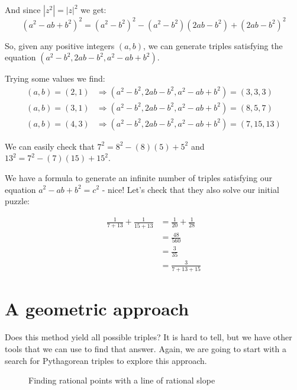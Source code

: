 \documentclass{article}
\begin{document}
And since $|z^2| = |z|^2$ we get:
\[ (a^2-ab+b^2)^2 = (a^2-b^2)^2 - (a^2-b^2)(2ab-b^2) + (2ab-b^2)^2 \]

So, given any positive integers $(a,b)$, we can generate triples satisfying the equation 
$(a^2-b^2, 2ab-b^2, a^2-ab+b^2)$.

Trying some values we find:
\begin{equation*}
        \begin{split}
		(a,b) = (2,1) & \Rightarrow (a^2-b^2, 2ab-b^2, a^2-ab+b^2) = (3, 3, 3) \\
		(a,b) = (3,1) & \Rightarrow (a^2-b^2, 2ab-b^2, a^2-ab+b^2) = (8, 5, 7) \\
		(a,b) = (4,3) & \Rightarrow (a^2-b^2, 2ab-b^2, a^2-ab+b^2) = (7, 15, 13)
	\end{split}
\end{equation*}

We can easily check that $7^2 = 8^2 - (8)(5) + 5^2$ and $13^2 = 7^2 - (7)(15) + 15^2$.

We have a formula to generate an infinite number of triples satisfying our equation $a^2-ab+b^2=c^2$ - nice!
Let's check that they also solve our initial puzzle:

\begin{equation*}
        \begin{split}
		\frac{1}{7+13} + \frac{1}{15+13} & = \frac{1}{20} + \frac{1}{28} \\
		& = \frac{48}{560} \\
		& = \frac{3}{35} \\
		& = \frac{3}{7 + 13 + 15}
        \end{split}
\end{equation*}

\section{A geometric approach}

Does this method yield all possible triples? It is hard to tell, but we have other tools that we can
use to find that answer. Again, we are going to start with a search for Pythagorean triples to
explore this approach.

\begin{figure}[htb]
        \caption{Finding rational points with a line of rational slope}
        \label{fig:pyth_circle}
\end{figure}
\end{document}
